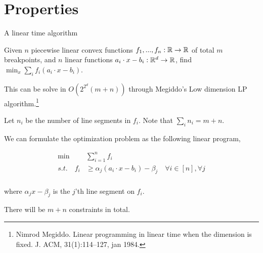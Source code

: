 \documentclass{beamer}
\begin{document}
\section{Properties}
\begin{frame}[allowframebreaks]{A linear time algorithm}
    \begin{problem}
        Given $n$ piecewise linear convex functions $f_1,...,f_n:\R \to \R$ of total $m$ breakpoints, and $n$ linear functions $a_i\cdot x-b_i:\R^d\to \R$, find $\min_x \sum_i f_i(a_i\cdot x-b_i)$.
    \end{problem}
    This can be solve in $O(2^{2^d} (m+n))$ through Megiddo's Low dimension LP algorithm.\footnote{Nimrod Megiddo. Linear programming in linear time when the dimension is fixed. J. ACM, 31(1):114–127, jan 1984.}

    Let $n_i$ be the number of line segments in $f_i$. Note that $\sum_i n_i=m+n$.

    We can formulate the optimization problem as the following linear program,
    \newpage

    \begin{align*}
        \min &\sum_{i=1}^n f_i\\
        s.t. \quad f_i&\geq \alpha_j(a_i\cdot x -b_i)-\beta_j \quad \forall i\in[n], \forall j\\
    \end{align*}

    where $\alpha_j x - \beta_j$ is the $j$'th line segment on $f_i$.

    There will be $m+n$ constraints in total.
\end{frame}
\end{document}
